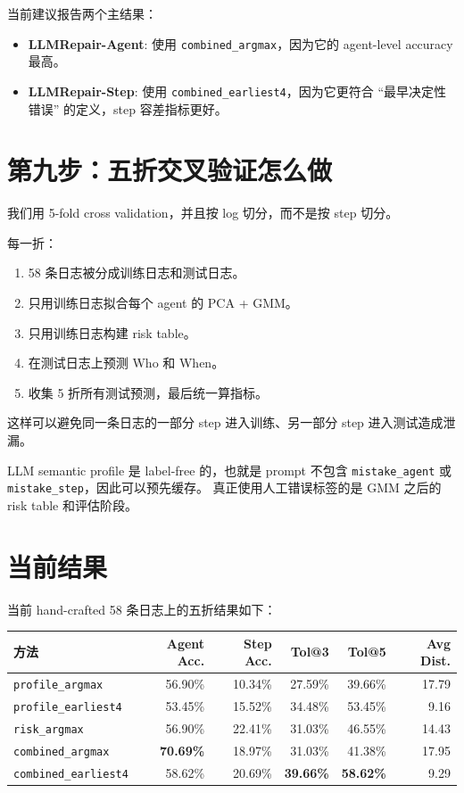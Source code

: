 \documentclass[UTF8,a4paper,11pt]{ctexart}
\begin{document}
当前建议报告两个主结果：

\begin{itemize}
  \item \textbf{LLMRepair-Agent}: 使用 \texttt{combined\_argmax}，因为它的 agent-level accuracy 最高。
  \item \textbf{LLMRepair-Step}: 使用 \texttt{combined\_earliest4}，因为它更符合 ``最早决定性错误'' 的定义，step 容差指标更好。
\end{itemize}

\section{第九步：五折交叉验证怎么做}

我们用 5-fold cross validation，并且按 log 切分，而不是按 step 切分。

每一折：

\begin{enumerate}
  \item 58 条日志被分成训练日志和测试日志。
  \item 只用训练日志拟合每个 agent 的 PCA + GMM。
  \item 只用训练日志构建 risk table。
  \item 在测试日志上预测 Who 和 When。
  \item 收集 5 折所有测试预测，最后统一算指标。
\end{enumerate}

这样可以避免同一条日志的一部分 step 进入训练、另一部分 step 进入测试造成泄漏。

LLM semantic profile 是 label-free 的，也就是 prompt 不包含 \texttt{mistake\_agent} 或 \texttt{mistake\_step}，因此可以预先缓存。
真正使用人工错误标签的是 GMM 之后的 risk table 和评估阶段。

\section{当前结果}

当前 hand-crafted 58 条日志上的五折结果如下：

\begin{table}[htbp]
\centering
\small
\begin{tabular}{lrrrrr}
\toprule
方法 & Agent Acc. & Step Acc. & Tol@3 & Tol@5 & Avg Dist. \\
\midrule
\texttt{profile\_argmax} & 56.90\% & 10.34\% & 27.59\% & 39.66\% & 17.79 \\
\texttt{profile\_earliest4} & 53.45\% & 15.52\% & 34.48\% & 53.45\% & 9.16 \\
\texttt{risk\_argmax} & 56.90\% & 22.41\% & 31.03\% & 46.55\% & 14.43 \\
\texttt{combined\_argmax} & \textbf{70.69\%} & 18.97\% & 31.03\% & 41.38\% & 17.95 \\
\texttt{combined\_earliest4} & 58.62\% & 20.69\% & \textbf{39.66\%} & \textbf{58.62\%} & 9.29 \\
\bottomrule
\end{tabular}
\end{table}
\end{document}

